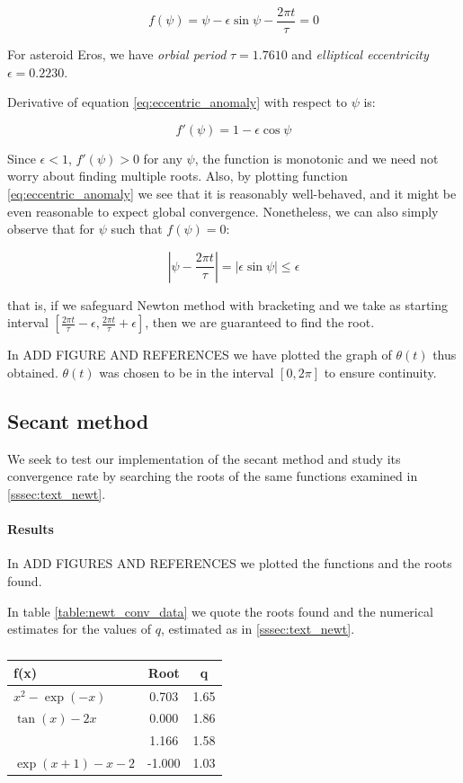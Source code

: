 \documentclass[a4paper,11]{article}
\begin{document}
\begin{equation}\label{eq:eccentric_anomaly}
	f(\psi) = \psi - \epsilon \sin{\psi} - \frac{2\pi t}{\tau} = 0
\end{equation}

For asteroid Eros, we have \textit{orbial period} $\tau = 1.7610$ and
\textit{elliptical eccentricity} $\epsilon = 0.2230$.

Derivative of equation \ref{eq:eccentric_anomaly} with respect to $\psi$ is:

\[
	f'(\psi) = 1 - \epsilon \cos{\psi}
\]

Since $\epsilon < 1$, $f'(\psi)>0$ for any $\psi$, the function is monotonic
and we need not worry about finding multiple roots. Also, by plotting function 
\ref{eq:eccentric_anomaly} we see that it is reasonably well-behaved, and it
might be even reasonable to expect global convergence.
Nonetheless, we can also simply observe that for $\psi$ such that $f(\psi) = 0$:

\[
	\left|\psi - \frac{2\pi t}{\tau}\right| = 
	\left| \epsilon \sin{\psi} \right| \leq \epsilon
\]

that is, if we safeguard Newton method with bracketing and we take as starting
interval $[\frac{2\pi t}{\tau} - \epsilon, \frac{2\pi t}{\tau} + \epsilon]$,
then we are guaranteed to find the root.

In ADD FIGURE AND REFERENCES we have plotted the graph of $\theta(t)$ thus 
obtained. $\theta(t)$ was chosen to be in the interval $[0, 2\pi]$ to ensure
continuity.

\subsection{Secant method}

We seek to test our implementation of the secant method and study its 
convergence rate by searching the roots of the same functions examined in 
\ref{sssec:text_newt}.

\paragraph{Results}

In ADD FIGURES AND REFERENCES we plotted the functions and the roots found.

In table \ref{table:newt_conv_data} we quote the roots found and the numerical 
estimates for the values of $q$, estimated as in \ref{sssec:text_newt}.


\begin{table}[ht]
	\centering
	\begin{tabular}{l|c|c}
		f(x) & Root & \approx q\\
		\hline
		$x^{2} - \exp(-x)$    & 0.703  & 1.65\\
		$\tan(x) - 2x$        & 0.000  & 1.86\\
		                      & 1.166  & 1.58\\
		$\exp(x + 1) - x - 2$ & -1.000 & 1.03
	\end{tabular}
	\caption{}
	\label{table:sec_conv_data}
\end{table}
\end{document}
